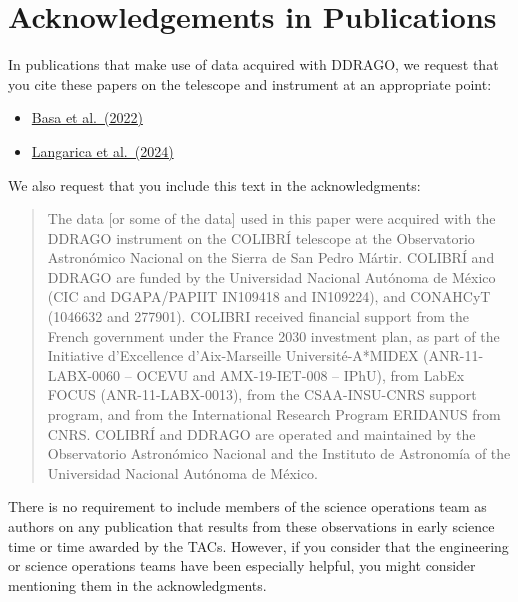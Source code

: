 \section{Acknowledgements in Publications}

In publications that make use of data acquired with DDRAGO, we request that you cite these papers on the telescope and instrument at an appropriate point:

\begin{itemize}
\item \href{https://ui.adsabs.harvard.edu/abs/2022SPIE12182E..1SB/abstract}{Basa et al.\ (2022)}
\item \href{https://ui.adsabs.harvard.edu/abs/2024SPIE13096E..3DL/abstract}{Langarica et al.\ (2024)}

\end{itemize}

We also request that you include this text in the acknowledgments:

\begin{quote}
The data [or some of the data] used in this paper were acquired with the DDRAGO instrument on the COLIBRÍ telescope at the Observatorio Astronómico Nacional on the Sierra de San Pedro Mártir. COLIBRÍ and DDRAGO are funded by the Universidad Nacional Autónoma de México (CIC and DGAPA/PAPIIT IN109418 and IN109224), and CONAHCyT (1046632 and 277901). COLIBRI received financial support from the French government under the France 2030 investment plan, as part of the Initiative d’Excellence d’Aix-Marseille Université-A*MIDEX  (ANR-11-LABX-0060 -- OCEVU and AMX-19-IET-008 -- IPhU), from LabEx FOCUS (ANR-11-LABX-0013), from the CSAA-INSU-CNRS support program, and from the International Research Program ERIDANUS from CNRS. COLIBRÍ and DDRAGO are operated and maintained by the Observatorio Astronómico Nacional and the Instituto de Astronomía of the Universidad Nacional Autónoma de México.
\end{quote}

There is no requirement to include members of the science operations team as authors on any publication that results from these observations in early science time or time awarded by the TACs. However, if you consider that the engineering or science operations teams have been especially helpful, you might consider mentioning them in the acknowledgments.
